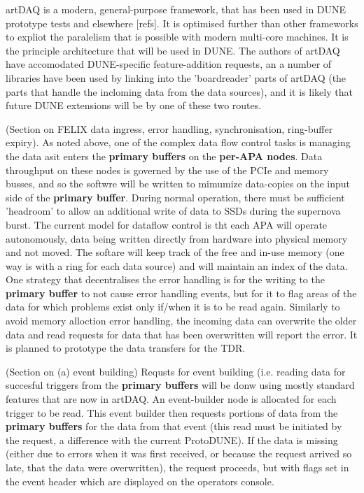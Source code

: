 artDAQ is a modern, general-purpose framework, that has been used in
DUNE prototype tests and elsewhere [refs].  It is optimised further
than other frameworks to expliot the paralelism that is possible with
modern multi-core machines.  It is the principle architecture that
will be used in DUNE. The authors of artDAQ have accomodated
DUNE-specific feature-addition requests, an a number of libraries have
been used by linking into the 'boardreader' parts of artDAQ (the parts
that handle the incloming data from the data sources), and it is
likely that future DUNE extensions will be by one of these two routes.

(Section on FELIX data ingress, error handling, synchronisation,
ring-buffer expiry).  As noted above, one of the complex data flow
control tasks is managing the data asit enters the {\bf primary
  buffers} on the {\bf per-APA nodes}.  Data throughput on these nodes
is governed by the use of the PCIe and memory busses, and so the
softwre will be written to mimumize data-copies on the input side of
the {\bf primary buffer}.  During normal operation, there must be
sufficient 'headroom' to allow an additional write of data to SSDs
during the supernova burst.  The current model for dataflow control is
tht each APA will operate autonomously, data being written directly
from hardware into physical memory and not moved.  The softare will
keep track of the free and in-use memory (one way is with a ring for
each data source) and will maintain an index of the data.  One
strategy that decentralises the error handling is for the writing to
the {\bf primary buffer} to not cause error handling events, but for
it to flag areas of the data for which problems exist only if/when it
is to be read again.  Similarly to avoid memory alloction error
handling, the incoming data can overwrite the older data and read
requests for data that has been overwritten will report the error.  It
is planned to prototype the data transfers for the TDR.

(Section on (a) event building) Requsts for event building
(i.e. reading data for succesful triggers from the {\bf primary
  buffers} will be donw using mostly standard features that are now in
artDAQ.  An event-builder node is allocated for each trigger to be
read.  This event builder then requests portions of data from the {\bf
  primary buffers} for the data from that event (this read must be
initiated by the request, a difference with the current ProtoDUNE).
If the data is missing (either due to errors when it was first
received, or because the request arrived so late, that the data were
overwritten), the request proceeds, but with flags set in the event
header which are displayed on the operators console.


